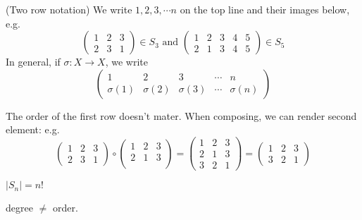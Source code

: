 \documentclass[a4pape]{article}
\begin{document}
\begin{notation}
 (Two row notation) We write $1, 2, 3, \cdots n$ on the top line and their images below, e.g.
  \[
  \begin{pmatrix}
    1 & 2 & 3\\
    2 & 3 & 1
  \end{pmatrix}\in S_3 \text{ and }
  \begin{pmatrix}
    1 & 2 & 3 & 4 & 5\\
    2 & 1 & 3 & 4 & 5
  \end{pmatrix}\in S_5
  \]
  In general, if $\sigma: X\to X$, we write
  \[
  \begin{pmatrix}
    1 & 2 & 3 &\cdots& n\\
    \sigma(1) & \sigma(2)&\sigma(3) &\cdots& \sigma{(n)}
  \end{pmatrix}
  \]
\begin{note}
  The order of the first row doesn't mater. When composing, we can render second element: e.g. 
  \[
  \begin{pmatrix}
    1 & 2 & 3\\
    2 & 3 & 1
  \end{pmatrix}
  \circ
  \begin{pmatrix}
    1 & 2 & 3\\
    2 & 1 & 3\\
  \end{pmatrix}
  =
  \begin{pmatrix}
    1 & 2 & 3\\
    2 & 1 & 3\\
    3 & 2 & 1
  \end{pmatrix}
  = 
  \begin{pmatrix}
    1 & 2 & 3\\
    3 & 2 & 1
  \end{pmatrix}
  \]
\end{note}
\end{notation}
\begin{prop}
  $|S_n| = n!$
\end{prop}
\note degree $\not=$ order.
\end{document}
